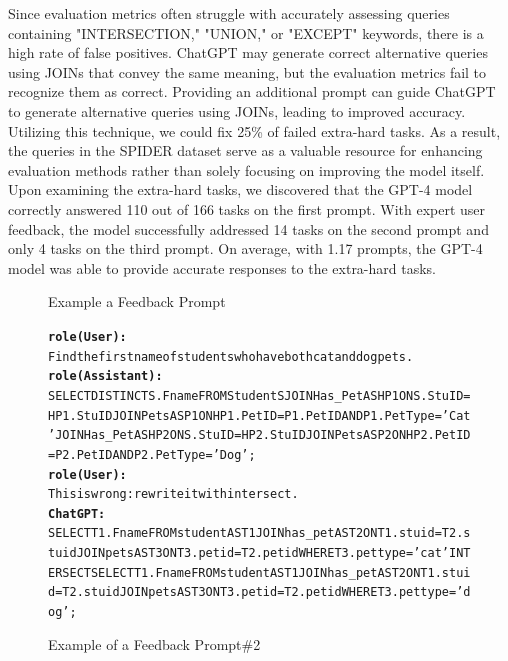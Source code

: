 Since evaluation metrics often struggle with accurately assessing queries containing "INTERSECTION," "UNION," or "EXCEPT" keywords, there is a high rate of false positives. ChatGPT may generate correct alternative queries using JOINs that convey the same meaning, but the evaluation metrics fail to recognize them as correct. Providing an additional prompt can guide ChatGPT to generate alternative queries using JOINs, leading to improved accuracy. Utilizing this technique, we could fix 25\% of failed extra-hard tasks. As a result, the queries in the SPIDER dataset serve as a valuable resource for enhancing evaluation methods rather than solely focusing on improving the model itself.
Upon examining the extra-hard tasks, we discovered that the GPT-4 model correctly answered 110 out of 166 tasks on the first prompt. With expert user feedback, the model successfully addressed 14 tasks on the second prompt and only 4 tasks on the third prompt. On average, with 1.17 prompts, the GPT-4 model was able to provide accurate responses to the extra-hard tasks.

\begin{figure}[H]
    \begin{AIbox}{Example a Feedback Prompt}
        \vspace{-10px}
        \parbox{1\textwidth}{\scriptsize
            \begin{alltt} \larger
                {\bf role(User):} \\
                Find the first name of students who have both cat and dog pets.
                \\
                {\bf role(Assistant):} \\
                SELECT DISTINCT S.Fname FROM Student S JOIN Has\_Pet AS HP1 ON S.StuID = HP1.StuID JOIN Pets AS P1 ON HP1.PetID = P1.PetID AND P1.PetType = 'Cat' JOIN Has\_Pet AS HP2 ON S.StuID = HP2.StuID JOIN Pets AS P2 ON HP2.PetID = P2.PetID AND P2.PetType = 'Dog';
                \\
                {\bf role(User):} \\
                This is wrong: rewrite it with intersect.
                \\
                {\bf ChatGPT:} \\
                SELECT T1.Fname FROM student AS T1 JOIN has\_pet AS T2 ON T1.stuid  =  T2.stuid JOIN pets AS T3 ON T3.petid  =  T2.petid WHERE T3.pettype  =  'cat' INTERSECT SELECT T1.Fname FROM student AS T1 JOIN has\_pet AS T2 ON T1.stuid  =  T2.stuid JOIN pets AS T3 ON T3.petid  =  T2.petid WHERE T3.pettype  =  'dog';
            \end{alltt}
        }
        \vspace{-10px}
    \end{AIbox}

    \caption{Example of a Feedback Prompt\#2}
\end{figure}

